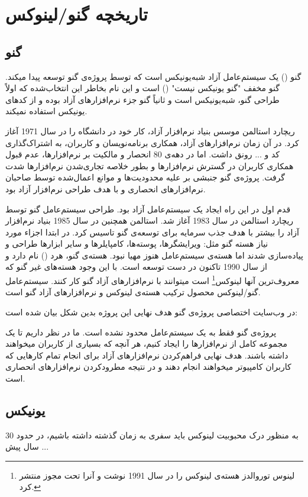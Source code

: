 \section{تاریخچه گنو/لینوکس}
\subsection*{گنو}
گنو () یک سیستم‌عامل آزاد شبه‌یونیکس است که توسط پروژه‌ی گنو توسعه پیدا میکند. گنو مخفف "گنو یونیکس نیست" () است و این نام بخاطر این انتخاب‌شده که اولاً طراحی گنو، شبه‌یونیکس است و ثانیاً گنو جزء نرم‌افزارهای آزاد بوده و از کدهای یونیکس استفاده نمیکند. 

ریچارد استالمن موسس بنیاد نرم‌افزار آزاد، کار خود در دانشگاه 
 را در سال 1971 آغاز کرد. در آن زمان نرم‌افزارهای آزاد، همکاری برنامه‌نویسان و کاربران، به اشتراک‌گذاری کد و ... رونق داشت. اما در دهه‌ی 80 انحصار و مالکیت بر نرم‌افزارها، عدم قبول همکاری کاربران در گسترش نرم‌افزارها و بطور خلاصه تجاری‌شدن نرم‌افزارها شدت گرفت. پروژه‌ی گنو جنبشی بر علیه محدودیت‌ها و موانع اعمال‌شده توسط صاحبان نرم‌افزارهای انحصاری و با هدف طراحی نرم‌افزار آزاد بود.
 
 قدم اول در این راه ایجاد یک سیستم‌عامل آزاد بود. طراحی سیستم‌عامل گنو توسط ریچارد استالمن در سال 1983 آغاز شد. استالمن همچنین در سال 1985 بنیاد نرم‌افزار آزاد را بیشتر با هدف جذب سرمایه برای توسعه‌ی گنو تاسیس کرد. در ابتدا اجزاء مورد نیاز هسته‌ گنو مثل: ویرایشگرها، پوسته‌ها، کامپایلرها و سایر ابزارها طراحی و پیاده‌سازی شدند اما هسته‌ی سیستم‌عامل هنوز مهیا نبود. هسته‌ی گنو، هرد () نام دارد و از سال 1990 تاکنون در دست توسعه است. با این وجود هسته‌های غیر گنو که معروف‌ترین آنها لینوکس\footnote{لینوس توروالدز هسته‌ی لینوکس را در سال 1991 نوشت و آنرا تحت مجوز 
	منتشر کرد.} است  میتوانند با نرم‌افزارهای آزاد گنو کار کنند. سیستم‌عامل گنو/لینوکس محصول ترکیب هسته‌ی لینوکس و نرم‌افزارهای آزاد گنو است. 

در وب‌سایت اختصاصی پروژه‌ی گنو هدف نهایی این پروژه بدین شکل بیان شده است:
\begin{mdframed}
 پروژه‌ی گنو فقط به یک سیستم‌عامل محدود نشده است. ما در نظر داریم تا یک مجموعه‌ کامل از نرم‌افزارها را ایجاد کنیم، هر آنچه که بسیاری از کاربران میخواهند داشته باشند. هدف نهایی فراهم‌کردن نرم‌افزارهای آزاد برای انجام تمام کارهایی که کاربران کامپیوتر میخواهند انجام دهند و در نتیجه مطرودکردن نرم‌افزارهای انحصاری است.
\end{mdframed}
\subsection*{یونیکس}
به منظور درک محبوبیت لینوکس باید سفری به زمان گذشته داشته باشیم، در حدود 30 سال پیش ...

